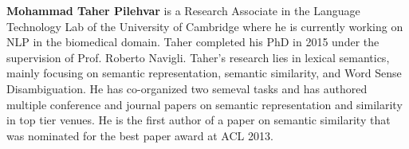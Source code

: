 \begin{bio}
{\bfseries Mohammad Taher Pilehvar} is a Research Associate in the Language Technology Lab of the University of Cambridge where he is currently working on NLP in the biomedical domain. Taher completed his PhD in 2015 under the supervision of Prof. Roberto Navigli. Taher's research lies in lexical semantics, mainly focusing on semantic representation, semantic similarity, and Word Sense Disambiguation. He has co-organized two semeval tasks and has authored multiple conference and journal papers on semantic representation and similarity in top tier venues. He is the first author of a paper on semantic similarity that was nominated for the best paper award at ACL 2013.
\end{bio}
